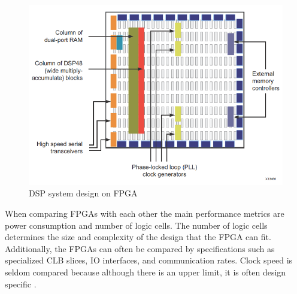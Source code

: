 \documentclass[12pt]{report}
\begin{document}
\begin{figure}[h]
    \centering
    \includegraphics[scale=0.5]{figures/contemporary_fpga.png}
    \caption{DSP system design on FPGA \citep{XilFPGAIntro}}
    \label{fig:5}
\end{figure}

When comparing FPGAs with each other the main performance metrics are power consumption and number of logic cells. The number of logic cells determines the size and complexity of the design that the FPGA can fit. Additionally, the FPGAs can often be compared by specifications such as specialized CLB slices, IO interfaces, and communication rates. Clock speed is seldom compared because although there is an upper limit, it is often design specific \citep{XilClbMan} \citep{XilFPGAIntro}. 
\end{document}
